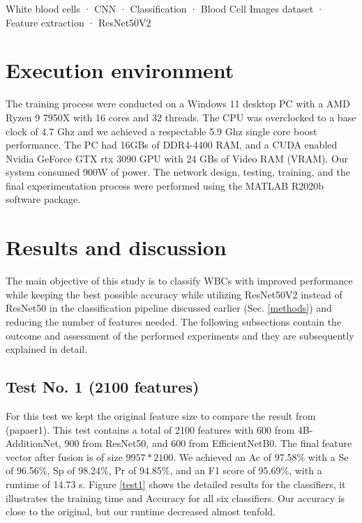 \documentclass[conference]{IEEEtran}
\begin{document}
\begin{IEEEkeywords}
White blood cells · CNN · Classification · Blood Cell Images dataset · Feature extraction · ResNet50V2
\end{IEEEkeywords}






\section{Execution environment}
The training process were conducted on a Windows 11 desktop PC with a AMD Ryzen 9 7950X with 16 cores and 32 threads. The CPU was overclocked to a base clock of 4.7 Ghz and we achieved a respectable 5.9 Ghz single core boost performance. The PC had 16GBs of DDR4-4400 RAM, and a CUDA enabled Nvidia GeForce GTX rtx 3090 GPU with 24 GBs of Video RAM (VRAM). Our system consumed 900W of power. The network design, testing, training, and the final experimentation process were performed using the MATLAB R2020b software package.
\section{Results and discussion}

The main objective of this study is to classify WBCs with improved performance while keeping the best possible accuracy while utilizing ResNet50V2 instead of ResNet50 in the classification pipeline discussed earlier (Sec. \ref{methods}) and reducing the number of features needed.
The following subsections contain the outcome and assessment of the performed experiments and they are subsequently explained in detail.

\subsection{Test No. 1 (2100 features)}
For this test we kept the original feature size to compare the result from (papaer1).
This test contains a total of 2100 features with 600 from 4B-AdditionNet, 900 from ResNet50, and 600 from EfficientNetB0. 
The final feature vector after fusion is of size $9957*2100$.
We achieved an Ac of 97.58\% with a Se of 96.56\%, Sp of 98.24\%, Pr of 94.85\%, and an F1 score of 95.69\%, with a runtime of 14.73 s. 
Figure \ref{test1} shows the detailed results for the classifiers, it illustrates the training time and Accuracy for all six classifiers.
Our accuracy is close to the original, but our runtime decreased almost tenfold.
\end{document}
